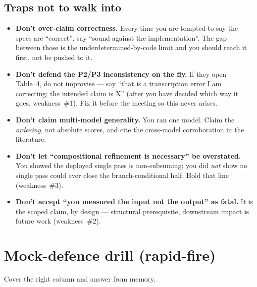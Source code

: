 \documentclass[11pt]{article}
\begin{document}
\subsection{Traps not to walk into}
\begin{itemize}[leftmargin=1.4em,itemsep=0.1em]
  \item \textbf{Don't over-claim correctness.} Every time you are tempted to
        say the specs are ``correct'', say ``sound against the implementation''.
        The gap between those is the underdetermined-by-code limit and you
        should reach it first, not be pushed to it.
  \item \textbf{Don't defend the P2/P3 inconsistency on the fly.} If they open
        Table~4, do not improvise --- say ``that is a transcription error I am
        correcting; the intended claim is X'' (after you have decided which way
        it goes, weakness~\#1). Fix it before the meeting so this never arises.
  \item \textbf{Don't claim multi-model generality.} You ran one model. Claim
        the \emph{ordering}, not absolute scores, and cite the cross-model
        corroboration in the literature.
  \item \textbf{Don't let ``compositional refinement is necessary'' be
        overstated.} You showed the deployed single pass is non-subsuming; you
        did \emph{not} show no single pass could ever close the
        branch-conditional half. Hold that line (weakness~\#3).
  \item \textbf{Don't accept ``you measured the input not the output'' as
        fatal.} It is the scoped claim, by design --- structural prerequisite,
        downstream impact is future work (weakness~\#2).
\end{itemize}

\section{Mock-defence drill (rapid-fire)}
\label{sec:drill}

Cover the right column and answer from memory.
\end{document}
